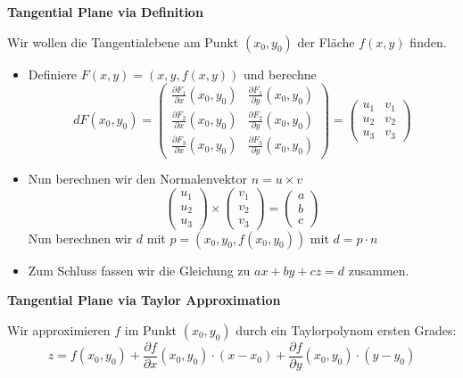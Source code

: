 \documentclass[25pt]{sciposter}
\newenvironment{method}[1]{\begin{mdframed}[backgroundcolor=blue!10,innertopmargin=15pt, innerbottommargin=15pt, nobreak=true]
		\textbf{#1 }
	}
	{ 
	\end{mdframed}
}
\begin{document}
\begin{multicols}{3}
\begin{method}{Tangential Plane via Definition}
	Wir wollen die Tangentialebene am Punkt $(x_0,y_0)$ der Fläche $f(x,y)$ finden. 
	\begin{itemize}
		\item Definiere $F(x,y) = (x,y,f(x,y))$ und berechne $$dF(x_0,y_0) = \begin{pmatrix}
\frac{\partial F_1}{\partial x} (x_0,y_0) & \frac{\partial F_1}{\partial y} (x_0,y_0)\\
\frac{\partial F_2}{\partial x} (x_0,y_0) & \frac{\partial F_2}{\partial y} (x_0,y_0)\\
\frac{\partial F_3}{\partial x} (x_0,y_0) & \frac{\partial F_3}{\partial y} (x_0,y_0)
		\end{pmatrix} = \begin{pmatrix}
		u_1 & v_1 \\ u_2 & v_2 \\ u_3 & v_3 
		\end{pmatrix}$$
		\item Nun berechnen wir den Normalenvektor $n = u \times v$
		$$\begin{pmatrix}
		u_1\\u_2\\u_3
		\end{pmatrix} \times \begin{pmatrix}
		v_1\\v_2\\v_3
		\end{pmatrix} = \begin{pmatrix}
		a \\ b \\ c
		\end{pmatrix}$$
		Nun berechnen wir $d$ mit $p = (x_0,y_0,f(x_0,y_0))$ mit $d=p\cdot n$
		\item Zum Schluss fassen wir die Gleichung zu $ax + by + cz = d$ zusammen.
	\end{itemize}
\end{method}

\begin{method}{Tangential Plane via Taylor Approximation}
	Wir approximieren $f$ im Punkt $(x_0,y_0)$ durch ein Taylorpolynom ersten Grades:
	$$z = f(x_0,y_0) + \frac{\partial f}{\partial x} (x_0,y_0) \cdot (x-x_0) + \frac{\partial f}{\partial y} (x_0,y_0) \cdot (y-y_0)$$
\end{method}



\end{multicols}
\end{document}

